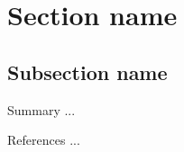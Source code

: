 \documentclass{beamer} %
\begin{document}
    \frame{\titlepage}
    
    \section{Section name}
    \subsection{Subsection name}
    \begin{frame}{Summary}
        ...
    \end{frame}
    
    \appendix
    \begin{frame}{References}
        ...
    \end{frame}
\end{document}

